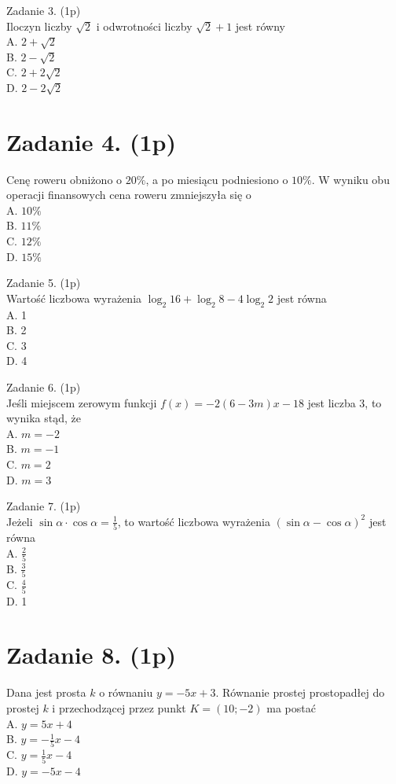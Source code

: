\documentclass[10pt]{article}
\begin{document}
Zadanie 3. (1p)\\
Iloczyn liczby \(\sqrt{2}\) i odwrotności liczby \(\sqrt{2}+1\) jest równy\\
A. \(2+\sqrt{2}\)\\
B. \(2-\sqrt{2}\)\\
C. \(2+2 \sqrt{2}\)\\
D. \(2-2 \sqrt{2}\)

\section*{Zadanie 4. (1p)}
Cenę roweru obniżono o \(20 \%\), a po miesiącu podniesiono o \(10 \%\). W wyniku obu operacji finansowych cena roweru zmniejszyła się o\\
A. \(10 \%\)\\
B. \(11 \%\)\\
C. \(12 \%\)\\
D. \(15 \%\)

Zadanie 5. (1p)\\
Wartość liczbowa wyrażenia \(\log _{2} 16+\log _{2} 8-4 \log _{2} 2\) jest równa\\
A. 1\\
B. 2\\
C. 3\\
D. 4

Zadanie 6. (1p)\\
Jeśli miejscem zerowym funkcji \(f(x)=-2(6-3 m) x-18\) jest liczba 3, to wynika stąd, że\\
A. \(m=-2\)\\
B. \(m=-1\)\\
C. \(m=2\)\\
D. \(m=3\)

Zadanie 7. (1p)\\
Jeżeli \(\sin \alpha \cdot \cos \alpha=\frac{1}{5}\), to wartość liczbowa wyrażenia \((\sin \alpha-\cos \alpha)^{2}\) jest równa\\
A. \(\frac{2}{5}\)\\
B. \(\frac{3}{5}\)\\
C. \(\frac{4}{5}\)\\
D. 1

\section*{Zadanie 8. (1p)}
Dana jest prosta \(k\) o równaniu \(y=-5 x+3\). Równanie prostej prostopadłej do prostej \(k\) i przechodzącej przez punkt \(K=(10 ;-2)\) ma postać\\
A. \(y=5 x+4\)\\
B. \(y=-\frac{1}{5} x-4\)\\
C. \(y=\frac{1}{5} x-4\)\\
D. \(y=-5 x-4\)
\end{document}
